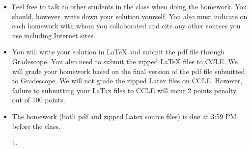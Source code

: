 \documentclass[12pt,letterpaper]{article}
\begin{document}
\begin{footnotesize}
	\begin{itemize}
		\item Feel free to talk to other students in the class when doing the homework. You should, however, write down your solution yourself. You also must indicate on each homework with whom you collaborated and cite any other sources you use including
		Internet sites.
		\item You will write your solution in LaTeX and submit the pdf file through Gradescope. You also need to submit the zipped LaTeX files to CCLE.
		We will grade your homework based on the final  version of the pdf file submitted to Gradescope. We will not grade the zipped Latex files on CCLE. However, failure to submitting your LaTax files to CCLE will incur 2 points penalty out of 100 points.	
				\item The homework (both pdf and zipped Latex source files) is due at 3:59 PM before the class.
	\end{itemize}
\end{footnotesize}


\begin{enumerate}
	

\item[1.] 


\end{enumerate}
	
\end{document}
